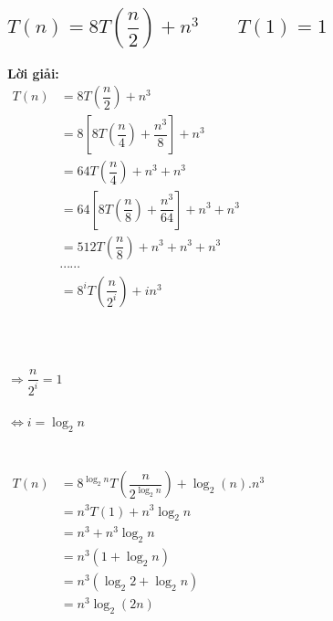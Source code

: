 \documentclass[12pt, letterpaper]{article}
\begin{document}
\subsection{$T(n) = 8T(\dfrac{n}{2}) + n^3 \quad \quad T(1) = 1$}
\textbf{Lời giải:} \\
$ \begin{aligned}
    T(n) &= 8T(\dfrac{n}{2}) + n^3 \\
        &= 8[8T(\dfrac{n}{4}) + \dfrac{n^3}{8}] + n^3 \\
        &= 64T(\dfrac{n}{4}) + n^3 + n^3 \\
        &= 64[8T(\dfrac{n}{8}) + \dfrac{n^3}{64}] + n^3 + n^3 \\
        &= 512T(\dfrac{n}{8}) + n^3 + n^3 + n^3 \\
        &\cdots \cdots \\
        &= 8^iT(\dfrac{n}{2^i}) + in^3 \\
\end{aligned} $ \\ \\ \\
 \\
$\Rightarrow \dfrac{n}{2^i} = 1$ \\ \\
$\Leftrightarrow i = \log_2{n}$ \\ \\
 \\
$ \begin{aligned}
    T(n) &= 8^{\log_2{n}}T(\dfrac{n}{2^{\log_2{n}}}) + \log_2(n).n^3 \\
        &= n^3T(1) + n^3\log_2{n} \\
        &= n^3 + n^3\log_2{n} \\
        &= n^3(1 + \log_2{n}) \\
        &= n^3(\log_2{2} + \log_2{n}) \\
        &= n^3\log_2(2n)
\end{aligned} $

\end{document}
